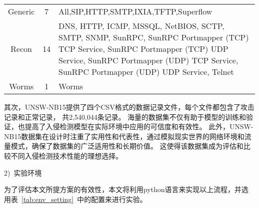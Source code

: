 \begin{table}[htbp]
\begin{tabularx}{\textwidth}{@{}ccX@{}}
		Generic                         & 7                               & All,SIP,HTTP,SMTP,IXIA,TFTP,Superflow                                                                                                                                                                                                                                                                                                                                                                                                                                                                                                                               \\
		Recon                           & 14                              & DNS, HTTP, ICMP, MSSQL, NetBIOS, SCTP, SMTP, SNMP, SunRPC, SunRPC Portmapper (TCP) TCP Service, SunRPC Portmapper (TCP) UDP Service, SunRPC Portmapper (UDP) TCP Service, SunRPC Portmapper (UDP) UDP Service, Telnet                                                                                                                                                                                                                                                                                                                                               \\
		Worms                           & 1                               & Worms                                                                                                                                                                                                                                                                                                                                                                                                                                                                                                                                                               \\
		\bottomrule
	\end{tabularx}
\end{table}\par

其次，UNSW-NB15提供了四个CSV格式的数据记录文件，每个文件都包含了攻击记录和正常记录，
共2,540,044条记录。
海量的数据集不仅有助于模型的训练和验证，也提高了入侵检测模型在实际环境中应用的可信度和有效性。
此外，UNSW-NB15数据集在设计时注重了实用性和代表性，通过模拟现实世界的网络环境和流量模式，确保了数据集的广泛适用性和长期价值。
这使得该数据集成为评估和比较不同入侵检测技术性能的理想选择。\par
2)~实验环境\par
为了评估本文所提方案的有效性，本文将利用python语言来实现以上流程，并选用表~\ref{tab:env_setting}~中的配置来进行实验。

